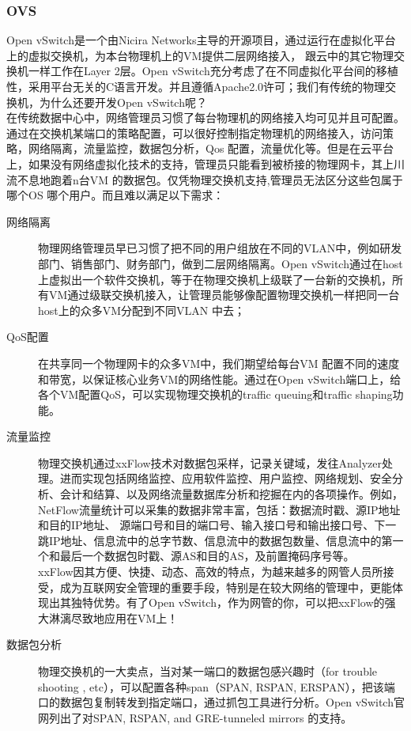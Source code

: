 \documentclass[a4paper, 11pt]{article}                                                   %
\begin{document}
\begin{CJK*}{UTF8}{song}
\subsubsection{OVS}
Open vSwitch是一个由Nicira Networks主导的开源项目，通过运行在虚拟化平台上的虚拟交换机，为本台物理机上的VM提供二层网络接入， 跟云中的其它物理交换机一样工作在Layer 2层。Open vSwitch充分考虑了在不同虚拟化平台间的移植性，采用平台无关的C语言开发。并且遵循Apache2.0许可；我们有传统的物理交换机，为什么还要开发Open vSwitch呢？\\
在传统数据中心中，网络管理员习惯了每台物理机的网络接入均可见并且可配置。通过在交换机某端口的策略配置，可以很好控制指定物理机的网络接入，访问策略，网络隔离，流量监控，数据包分析，Qos 配置，流量优化等。但是在云平台上，如果没有网络虚拟化技术的支持，管理员只能看到被桥接的物理网卡，其上川流不息地跑着n台VM 的数据包。仅凭物理交换机支持,管理员无法区分这些包属于哪个OS 哪个用户。而且难以满足以下需求：
\begin{description}
  \item[网络隔离] 物理网络管理员早已习惯了把不同的用户组放在不同的VLAN中，例如研发部门、销售部门、财务部门，做到二层网络隔离。Open vSwitch通过在host上虚拟出一个软件交换机，等于在物理交换机上级联了一台新的交换机，所有VM通过级联交换机接入，让管理员能够像配置物理交换机一样把同一台host上的众多VM分配到不同VLAN 中去；
  \item[QoS配置] 在共享同一个物理网卡的众多VM中，我们期望给每台VM 配置不同的速度和带宽，以保证核心业务VM的网络性能。通过在Open vSwitch端口上，给各个VM配置QoS，可以实现物理交换机的traffic queuing和traffic shaping功能。
  \item[流量监控] 物理交换机通过xxFlow技术对数据包采样，记录关键域，发往Analyzer处理。进而实现包括网络监控、应用软件监控、用户监控、网络规划、安全分析、会计和结算、以及网络流量数据库分析和挖掘在内的各项操作。例如，NetFlow流量统计可以采集的数据非常丰富，包括：数据流时戳、源IP地址和目的IP地址、 源端口号和目的端口号、输入接口号和输出接口号、下一跳IP地址、信息流中的总字节数、信息流中的数据包数量、信息流中的第一个和最后一个数据包时戳、源AS和目的AS，及前置掩码序号等。\\
      xxFlow因其方便、快捷、动态、高效的特点，为越来越多的网管人员所接受，成为互联网安全管理的重要手段，特别是在较大网络的管理中，更能体现出其独特优势。有了Open vSwitch，作为网管的你，可以把xxFlow的强大淋漓尽致地应用在VM上！
  \item[数据包分析] 物理交换机的一大卖点，当对某一端口的数据包感兴趣时（for trouble shooting , etc），可以配置各种span（SPAN, RSPAN, ERSPAN），把该端口的数据包复制转发到指定端口，通过抓包工具进行分析。Open vSwitch官网列出了对SPAN, RSPAN, and GRE-tunneled mirrors 的支持。

\end{description}
\end{CJK*}
\end{document}
